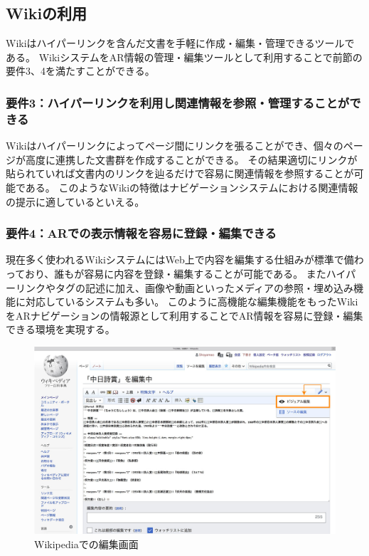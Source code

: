 \subsection{Wikiの利用}
Wikiはハイパーリンクを含んだ文書を手軽に作成・編集・管理できるツールである。
WikiシステムをAR情報の管理・編集ツールとして利用することで前節の要件3、4を満たすことができる。

\subsubsection*{要件3：ハイパーリンクを利用し関連情報を参照・管理することができる}
Wikiはハイパーリンクによってページ間にリンクを張ることができ、個々のページが高度に連携した文書群を作成することができる。
その結果適切にリンクが貼られていれば文書内のリンクを辿るだけで容易に関連情報を参照することが可能である。
このようなWikiの特徴はナビゲーションシステムにおける関連情報の提示に適しているといえる。

\subsubsection*{要件4：ARでの表示情報を容易に登録・編集できる}
現在多く使われるWikiシステムにはWeb上で内容を編集する仕組みが標準で備わっており、誰もが容易に内容を登録・編集することが可能である。
またハイパーリンクやタグの記述に加え、画像や動画といったメディアの参照・埋め込み機能に対応しているシステムも多い。
このように高機能な編集機能をもったWikiをARナビゲーションの情報源として利用することでAR情報を容易に登録・編集できる環境を実現する。

\begin{figure}[h]
  \centering
  \includegraphics[width=120mm]{images/wikipedia_edit.png}
  \caption{Wikipediaでの編集画面} \label{fig:wikipedia_edit}
\end{figure}

